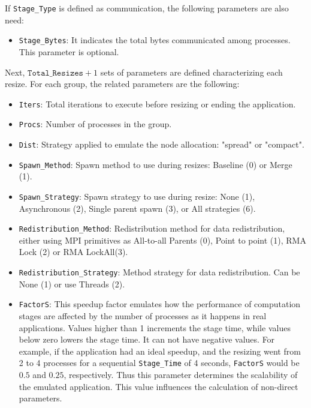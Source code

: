 If \texttt{Stage\_Type} is defined as communication, the following parameters are also need:
\begin{itemize}
    \item \texttt{Stage\_Bytes}: It indicates the total bytes communicated among processes. This parameter is optional.
\end{itemize}

Next, $\texttt{Total\_Resizes}+1$ sets of parameters are defined characterizing each resize. %
For each group, the related parameters are the following:
\begin{itemize}
    \item \texttt{Iters}: Total iterations to execute before resizing or ending the application.
    \item \texttt{Procs}: Number of processes in the group.
    \item \texttt{Dist}: Strategy applied to emulate the node allocation: "spread" or "compact".
    \item \texttt{Spawn\_Method}: Spawn method to use during resizes: Baseline (0) or Merge (1).
    \item \texttt{Spawn\_Strategy}: Spawn strategy to use during resize: None (1), Asynchronous (2), Single parent spawn (3), or All strategies (6).
    \item \texttt{Redistribution\_Method}: Redistribution method for data redistribution, either using MPI primitives as All-to-all Parents (0), Point to point (1), RMA Lock (2) or RMA LockAll(3).
    \item \texttt{Redistribution\_Strategy}: Method strategy for data redistribution. Can be None (1) or use Threads (2).
    \item \texttt{FactorS}: This speedup factor emulates how the performance of computation stages are affected by the number of processes as it happens in real applications. Values higher than 1 increments the stage time, while values below zero lowers the stage time. It can not have negative values.
    For example, if the application had an ideal speedup, and the resizing went from 2 to 4 processes for a sequential \texttt{Stage\_Time} of 4 seconds, \texttt{FactorS} would be $0.5$ and $0.25$, respectively. Thus this parameter determines the scalability of the emulated application. This value influences the calculation of non-direct parameters.%
\end{itemize}
